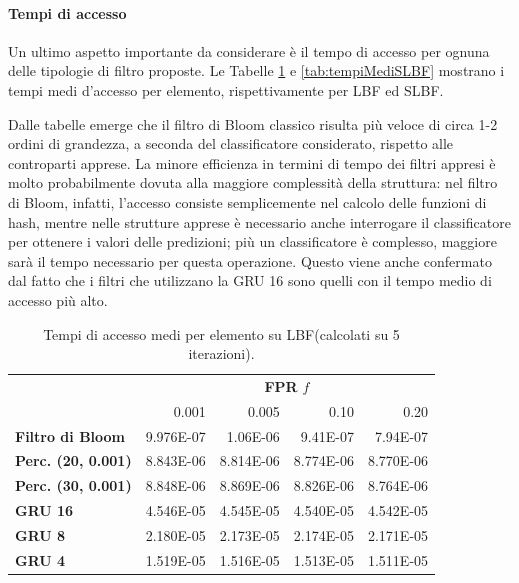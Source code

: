 \documentclass[../../main.tex]{subfiles}
\begin{document}
    \paragraph{Tempi di accesso}
    Un ultimo aspetto importante da considerare è il tempo di accesso per ognuna delle tipologie di filtro proposte. Le Tabelle \ref{tab:tempiMediLBF} e \ref{tab:tempiMediSLBF} mostrano i tempi medi d'accesso per elemento, rispettivamente per LBF ed SLBF.

    Dalle tabelle emerge che il filtro di Bloom classico risulta più veloce di circa 1-2 ordini di grandezza, a seconda del classificatore considerato, rispetto alle controparti apprese. La minore efficienza in termini di tempo dei filtri appresi è molto probabilmente dovuta alla maggiore complessità della struttura: nel filtro di Bloom, infatti, l'accesso consiste semplicemente nel calcolo delle funzioni di hash, mentre nelle strutture apprese è necessario anche interrogare il classificatore per ottenere i valori delle predizioni; più un classificatore è complesso, maggiore sarà il tempo necessario per questa operazione. Questo viene anche confermato dal fatto che i filtri che utilizzano la GRU 16 sono quelli con il tempo medio di accesso più alto.

    \begin{table}[H]
        \centering
        \begin{tabular}{lrrrr}
            \toprule
            & \multicolumn{4}{c}{\textbf{FPR} $f$}\\
            & 0.001 & 0.005 & 0.10 & 0.20\\        
            \midrule
            \textbf{Filtro di Bloom} & 9.976E-07 & 1.06E-06 & 9.41E-07 & 7.94E-07\\
            \midrule
            \textbf{Perc. (20, 0.001)} & 8.843E-06 & 8.814E-06 &  8.774E-06 & 8.770E-06\\
            \textbf{Perc. (30, 0.001)} & 8.848E-06 & 8.869E-06 &  8.826E-06 & 8.764E-06\\
            \textbf{GRU 16} & 4.546E-05 & 4.545E-05 &  4.540E-05 & 4.542E-05\\
            \textbf{GRU 8} &  2.180E-05 & 2.173E-05 &  2.174E-05 & 2.171E-05\\
            \textbf{GRU 4} & 1.519E-05 & 1.516E-05 & 1.513E-05 & 1.511E-05\\
            \bottomrule
        \end{tabular}
        \caption{Tempi di accesso medi per elemento su LBF(calcolati su 5 iterazioni).}
        \label{tab:tempiMediLBF}
    \end{table}
\end{document}
